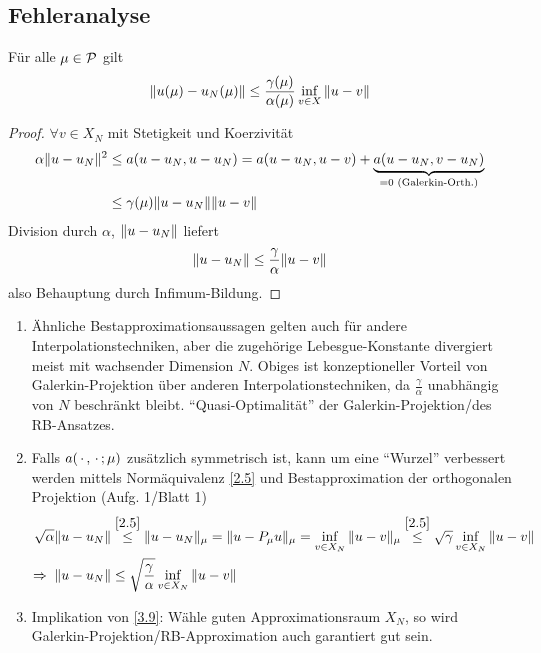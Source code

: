 \subsection{Fehleranalyse}

\begin{satz} \label{3.9}
	Für alle $\mu \in \mathcal{P}$ gilt
	\[
		\|u(\mu)-u_N(\mu)\| \leq \frac{\gamma(\mu)}{\alpha(\mu)} \inf_{v \in X} \|u-v\|
	\]

	\begin{proof}
		$\forall v \in X_N$ mit Stetigkeit und Koerzivität
		\begin{align*}
			\alpha \|u-u_N\|^2 &\leq a(u-u_N,u-u_N) = a(u-u_N,u-v) + \underbrace{a(u-u_N,v-u_N)}_{= 0 \text{ (Galerkin-Orth.)}}\\
			&\leq \gamma(\mu) \|u-u_N\| \|u-v\|
		\end{align*}
		Division durch $\alpha$, $\|u-u_N\|$ liefert
		\[
			\|u-u_N\| \leq \frac{\gamma}{\alpha} \|u-v\|
		\]
		also Behauptung durch Infimum-Bildung.
	\end{proof}
\end{satz}

\begin{bem} \beginwithlistbem
	\begin{enumerate}
		\item Ähnliche Bestapproximationsaussagen gelten auch für andere Interpolationstechniken, aber die zugehörige Lebesgue-Konstante divergiert meist mit wachsender Dimension $N$.
			Obiges ist konzeptioneller Vorteil von Galerkin-Projektion über anderen Interpolationstechniken, da $\frac{\gamma}{\alpha}$ unabhängig von $N$ beschränkt bleibt.
			``Quasi-Optimalität'' der Galerkin-Projektion/des RB-Ansatzes.
		\item Falls $a(\,\cdot\,,\,\cdot\,;\mu)$ zusätzlich symmetrisch ist, kann um eine ``Wurzel'' verbessert werden mittels Normäquivalenz \ref{2.5} und Bestapproximation der orthogonalen Projektion (Aufg. 1/Blatt 1)
			\begin{align*}
				\sqrt{\alpha} \|u-u_N\| &\stackrel{\ref{2.5}}{\leq} \|u-u_N\|_\mu = \|u-P_\mu u\|_\mu = \inf_{v \in X_N} \|u-v\|_\mu \stackrel{\ref{2.5}}{\leq} \sqrt{\gamma} \inf_{v \in X_N} \|u-v\|\\
				\Rightarrow \; \|u-u_N\| &\leq \sqrt{\frac \gamma \alpha} \inf_{v \in X_N} \|u-v\|
			\end{align*}
		\item Implikation von \ref{3.9}: Wähle guten Approximationsraum $X_N$, so wird Galerkin-Projektion/RB-Approximation auch garantiert gut sein.
	\end{enumerate}
\end{bem}

